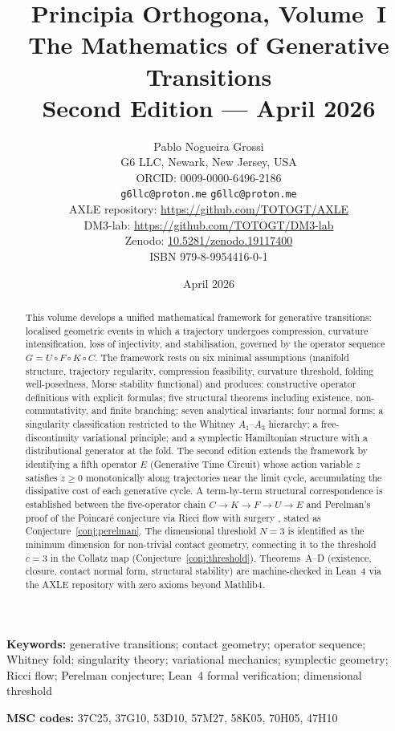 \documentclass[12pt,a4paper]{article}
\title{%
  \textbf{Principia Orthogona, Volume~I}\\[0.3em]
  \textbf{The Mathematics of Generative Transitions}\\[0.5em]
  \large Second Edition --- April 2026%
}
\author{%
  Pablo Nogueira Grossi\\
  G6 LLC, Newark, New Jersey, USA\\
  ORCID: 0009-0000-6496-2186\\
  \texttt{g6llc@proton.me} \quad \texttt{g6llc@proton.me}\\[0.3em]
  \small AXLE repository: \url{https://github.com/TOTOGT/AXLE}\\
  \small DM3-lab: \url{https://github.com/TOTOGT/DM3-lab}\\
  \small Zenodo: \href{https://doi.org/10.5281/zenodo.19117400}{10.5281/zenodo.19117400}\\
  \small ISBN 979-8-9954416-0-1%
}
\date{April 2026}
\begin{document}
\maketitle

\begin{abstract}
This volume develops a unified mathematical framework for generative
transitions: localised geometric events in which a trajectory undergoes
compression, curvature intensification, loss of injectivity, and
stabilisation, governed by the operator sequence
$G = U \circ F \circ K \circ C$.
The framework rests on six minimal assumptions (manifold structure,
trajectory regularity, compression feasibility, curvature threshold,
folding well-posedness, Morse stability functional) and produces:
constructive operator definitions with explicit formulas; five
structural theorems including existence, non-commutativity, and finite
branching; seven analytical invariants; four normal forms; a singularity
classification restricted to the Whitney $A_1$--$A_3$ hierarchy;
a free-discontinuity variational principle; and a symplectic
Hamiltonian structure with a distributional generator at the fold.
The second edition extends the framework by identifying a fifth
operator $E$ (Generative Time Circuit) whose action variable $z$
satisfies $\dot{z} \geq 0$ monotonically along trajectories near the
limit cycle, accumulating the dissipative cost of each generative cycle.
A term-by-term structural correspondence is established between the
five-operator chain $C \to K \to F \to U \to E$ and Perelman's proof
of the Poincar\'e conjecture via Ricci flow with surgery
\cite{Perelman2002,Perelman2003a,Perelman2003b}, stated as
Conjecture~\ref{conj:perelman}.
The dimensional threshold $N = 3$ is identified as the minimum
dimension for non-trivial contact geometry, connecting it to the
threshold $c = 3$ in the Collatz map
(Conjecture~\ref{conj:threshold}).
Theorems~A--D (existence, closure, contact normal form, structural
stability) are machine-checked in Lean~4 via the AXLE repository
\cite{AXLE2026} with zero axioms beyond Mathlib4.
\end{abstract}

\textbf{Keywords:} generative transitions; contact geometry;
operator sequence; Whitney fold; singularity theory; variational
mechanics; symplectic geometry; Ricci flow; Perelman conjecture;
Lean~4 formal verification; dimensional threshold

\textbf{MSC codes:} 37C25, 37G10, 53D10, 57M27, 58K05, 70H05, 47H10
\end{document}
